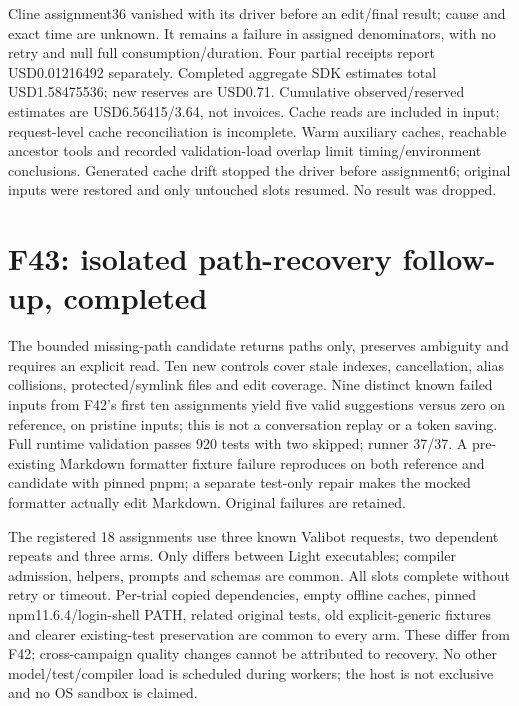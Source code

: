 \documentclass[11pt,a4paper]{article}
\newcommand{\code}[1]{\texttt{\detokenize{#1}}}
\begin{document}
Cline assignment36 vanished with its driver before an edit/final result; cause
and exact time are unknown. It remains a failure in assigned denominators,
with no retry and null full consumption/duration. Four partial receipts report
USD0.01216492 separately. Completed aggregate SDK estimates total USD1.58475536;
new reserves are USD0.71. Cumulative observed/reserved estimates are
USD6.56415/3.64, not invoices. Cache reads are included in input; request-level
cache reconciliation is incomplete. Warm auxiliary caches, reachable ancestor
tools and recorded validation-load overlap limit timing/environment conclusions.
Generated cache drift stopped the driver before assignment6; original inputs
were restored and only untouched slots resumed. No result was dropped.

\section{F43: isolated path-recovery follow-up, completed}
The bounded missing-path candidate returns paths only, preserves ambiguity and
requires an explicit read. Ten new controls cover stale indexes, cancellation,
alias collisions, protected/symlink files and edit coverage. Nine distinct known
failed inputs from F42's first ten assignments yield five valid suggestions
versus zero on reference, on pristine inputs; this is not a conversation replay
or a token saving. Full runtime validation passes 920 tests with two skipped;
runner 37/37. A pre-existing Markdown formatter fixture failure reproduces on
both reference and candidate with pinned pnpm; a separate test-only repair makes
the mocked formatter actually edit Markdown. Original failures are retained.

The registered 18 assignments use three known Valibot requests, two dependent
repeats and three arms. Only \code{light-workspace.js} differs between Light
executables; compiler admission, helpers, prompts and schemas are common.
All slots complete without retry or timeout. Per-trial copied dependencies,
empty offline caches, pinned npm11.6.4/login-shell PATH, related original tests,
old explicit-generic fixtures and clearer existing-test preservation are common
to every arm. These differ from F42; cross-campaign quality changes cannot be
attributed to recovery. No other model/test/compiler load is scheduled during
workers; the host is not exclusive and no OS sandbox is claimed.
\end{document}
